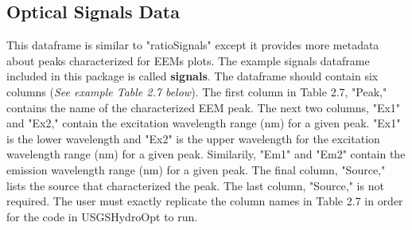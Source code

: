\documentclass[a4paper,11pt]{article}\usepackage[]{graphicx}\usepackage[]{color}
\begin{document}
\subsection{Optical Signals Data}
This dataframe is similar to "ratioSignals" except it provides more metadata about peaks characterized for EEMs plots. The example signals dataframe included in this package is called \textbf{signals}. The dataframe should contain six columns (\emph{See example Table 2.7 below}). The first column in Table 2.7, "Peak," contains the name of the characterized EEM peak. The next two columns, "Ex1" and "Ex2," contain the excitation wavelength range (nm) for a given peak. "Ex1" is the lower wavelength and "Ex2" is the upper wavelength for the excitation wavelength range (nm) for a given peak. Similarily, "Em1" and "Em2" contain the emission wavelength range (nm) for a given peak. The final column, "Source," lists the source that characterized the peak. The last column, "Source," is not required. The user must exactly replicate the column names in Table 2.7 in order for the code in USGSHydroOpt to run.
\end{document}
